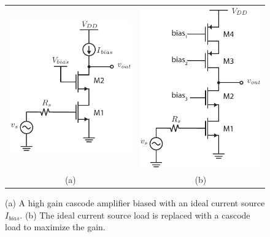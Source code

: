 \begin{figure}[tb]
\begin{center}
\begin{tabular}{cc}
\includegraphics[scale=1]{15cascode_current_source_dc} &
\includegraphics[scale=1]{cascode_current_load_cascode.pdf} \\
(a) & (b) \\
\end{tabular}
\end{center}
\caption{(a) A high gain cascode amplifier biased with an ideal current source $I_{bias}$.  (b) The ideal current source load is replaced with a cascode load to maximize the gain.}  \label{fig:15cascode_current_source_dc}
\end{figure}

